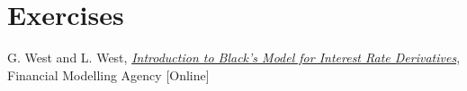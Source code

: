 \section*{Exercises}


\begin{thebibliography}{9}
 G. West and L. West, \href{http://janroman.dhis.org/finance/Black/IntroToBlack.pdf}{\emph{Introduction to Black's Model for Interest Rate Derivatives}}, Financial Modelling Agency [Online]
\end{thebibliography}